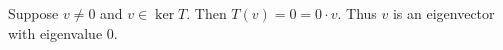 Suppose $v\neq 0$ and $v\in\ker T.$ Then $T(v)=0=0\cdot v.$ Thus $v$ is an eigenvector with eigenvalue $0.$